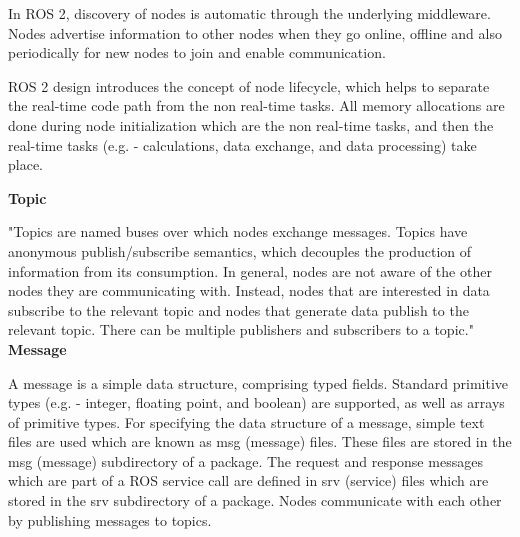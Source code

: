 \documentclass[%
xelatex,
	oneside,		%
	12pt,			%
	parskip=half,	%
	abstracton,
	chapterprefix=true%
    appendixprefix=true]
{scrbook}
\begin{document}
In ROS 2, discovery of nodes is automatic through the underlying middleware. Nodes advertise information to other nodes when they go online, offline and also periodically for new nodes to join and enable communication. 

ROS 2 design introduces the concept of node lifecycle, which helps to separate the real-time code path from the non real-time tasks. All memory allocations are done during node initialization which are the non real-time tasks, and then the real-time tasks (e.g. - calculations, data exchange, and data processing) take place. 


\vspace*{0.4cm}
	{\bfseries Topic}
	
	
	\vspace*{0.4cm}
	"Topics are named buses over which nodes exchange messages. Topics have anonymous publish/subscribe semantics, which decouples the production of information from its consumption. In general, nodes are not aware of the other nodes they are communicating with. Instead, nodes that are interested in data subscribe to the relevant topic and nodes that generate data publish to the relevant topic. There can be multiple publishers and subscribers to a topic." \cite{topic}
\clearpage
	{\bfseries Message}
	
	
	\vspace*{0.5cm}
A message is a simple data structure, comprising typed fields. Standard primitive types (e.g. - integer, floating point, and boolean) are supported, as well as arrays of primitive types. For specifying the data structure of a message, simple text files are used which are known as msg (message) files. These files are stored in the msg (message) subdirectory of a package. The request and response messages which are part of a ROS service call are defined in srv (service) files which are stored in the srv subdirectory of a package. Nodes communicate with each other by publishing messages to topics.\cite{messages}
\end{document}
